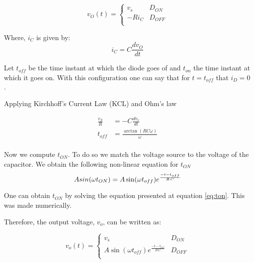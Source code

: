 \begin{equation}
	v_O(t) = \left\{
	\begin{array}{ll}
		v_s & D_{ON} \\
	 -R i_C & D_{OFF}\\
  \end{array}
\right.
\end{equation}

Where, $i_C$ is given by:
\begin{equation}
  i_C=C \frac{d v_O}{dt}
\end{equation}

Let $t_{off}$ be the time instant at which the diode goes of and $t_{on}$ the time instant at which it goes on. With this configuration one can say that for $t=t_{off}$ that $i_D=0$.


Applying Kirchhoff's Current Law (KCL) and Ohm's law

\begin{equation}
\begin{split}
  \frac{v_S}{R} &=-C\frac{dv_c}{dt}\\
  t_{off} &=\frac{\arctan(RC\omega)}{\omega}\\
\end{split}
\end{equation}



Now we compute $t_{ON}$. To do so we match the voltage source to the voltage of the capacitor. We obtain the following non-linear equation for $t_{ON}$
\begin{equation}
	A sin(\omega t_{ON}) =A  \sin(\omega t_{off})  e^{\frac{-t-t_{off}}{R\,C}}\\
\label{eq:ton}
\end{equation}

One can obtain $t_{ON}$ by solving the equation presented at equation \ref{eq:ton}. This was made numerically.

Therefore, the output voltage, $v_o$, can be written as:

\begin{equation}
	v_o(t) = \left\{
\begin{array}{ll}
	v_s & D_{ON} \\
	A  \sin(\omega t_{off})  e^{\frac{-t-t_{off}}{R\,C}} & D_{OFF}\\
\end{array}
\right.
\end{equation}

